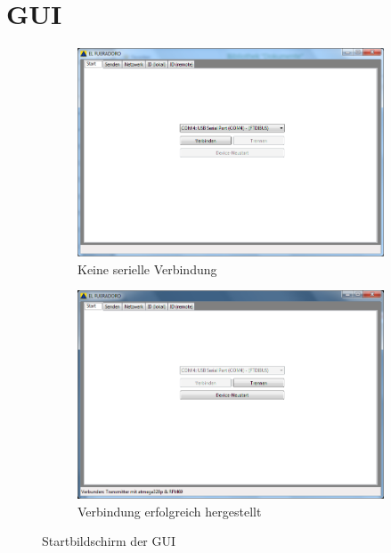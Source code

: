 \documentclass[paper=a4, parskip, numbers=noenddot, toc=listof, headsepline]{scrbook}
\begin{document}
		 \section{GUI}

		  \begin{figure}[!h]%
			  \centering
			  \begin{subfigure}[t]{0.45\textwidth}
				  \includegraphics[width=\textwidth]{bilder/gui-start}
				  \caption{Keine serielle Verbindung}
				  \label{fig:gui-unconnected}
			  \end{subfigure}
			  \begin{subfigure}[t]{0.45\textwidth}
				  \includegraphics[width=\textwidth]{bilder/gui-connected}
				  \caption{Verbindung erfolgreich hergestellt}
				  \label{fig:gui-connected}
			  \end{subfigure}
			  \caption{Startbildschirm der GUI}
			  \label{fig:gui-start}
		  \end{figure}
\end{document}
